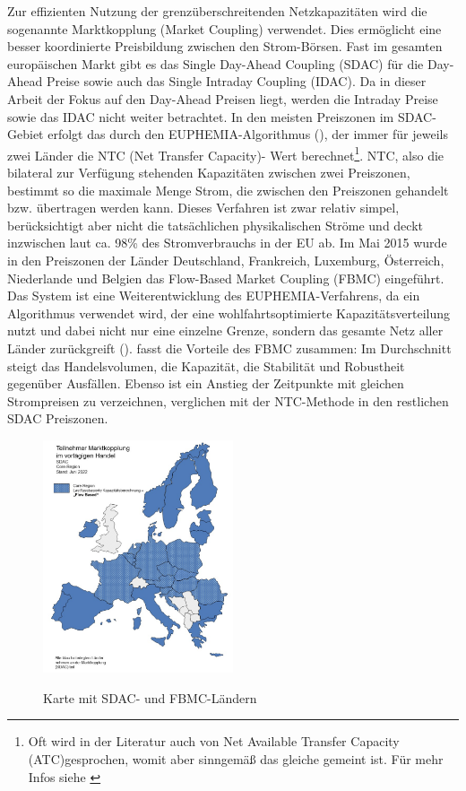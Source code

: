 Zur effizienten Nutzung der grenzüberschreitenden Netzkapazitäten wird die sogenannte Marktkopplung (Market Coupling) verwendet. Dies ermöglicht eine besser koordinierte Preisbildung zwischen den Strom-Börsen. Fast im gesamten europäischen Markt gibt es das Single Day-Ahead Coupling (SDAC) für die Day-Ahead Preise sowie auch das Single Intraday Coupling (IDAC). Da in dieser Arbeit der Fokus auf den Day-Ahead Preisen liegt, werden die Intraday Preise sowie das IDAC nicht weiter betrachtet. In den meisten Preiszonen im SDAC-Gebiet erfolgt das durch den EUPHEMIA-Algorithmus (\cite{ENTSOE_SDAC}), der immer für jeweils zwei Länder die NTC (Net Transfer Capacity)- Wert berechnet\footnote{Oft wird in der Literatur auch von Net Available Transfer Capacity (ATC)gesprochen, womit aber sinngemäß das gleiche gemeint ist. Für mehr Infos siehe \cite{ENTSOE_ATC_NTC}}. NTC, also die bilateral  zur Verfügung stehenden Kapazitäten zwischen zwei Preiszonen, bestimmt so die maximale Menge Strom, die zwischen den Preiszonen gehandelt bzw. übertragen werden kann. Dieses Verfahren ist zwar relativ simpel, berücksichtigt aber nicht die tatsächlichen physikalischen Ströme und deckt inzwischen laut \cite{ENTSOE_SDAC} ca. 98\% des Stromverbrauchs in der EU ab. Im Mai 2015 wurde in den Preiszonen der Länder Deutschland, Frankreich, Luxemburg, Österreich, Niederlande und Belgien das Flow-Based Market Coupling (FBMC) eingeführt. Das System ist eine Weiterentwicklung des EUPHEMIA-Verfahrens, da ein Algorithmus verwendet wird, der eine wohlfahrtsoptimierte Kapazitätsverteilung nutzt und dabei nicht nur eine einzelne Grenze, sondern das gesamte Netz aller Länder zurückgreift (\cite{Bundesnetzagentur}). \cite{21} fasst die Vorteile des FBMC zusammen: Im Durchschnitt steigt das Handelsvolumen, die Kapazität,  die Stabilität und Robustheit gegenüber Ausfällen. Ebenso ist ein Anstieg der Zeitpunkte mit gleichen Strompreisen zu verzeichnen, verglichen mit der NTC-Methode in den restlichen SDAC Preiszonen. 

\begin{figure}[htbp]
    \centering  \href{https://www.bundesnetzagentur.de/DE/Fachthemen/ElektrizitaetundGas/HandelundVertrieb/EuropMarktkopplung/artikel.html}{\includegraphics[width=0.5\textwidth]{Graphs/Abbildung1.png}}
    \caption{Karte mit SDAC- und FBMC-Ländern}
    \label{fig:Abbildung1}
\end{figure}

